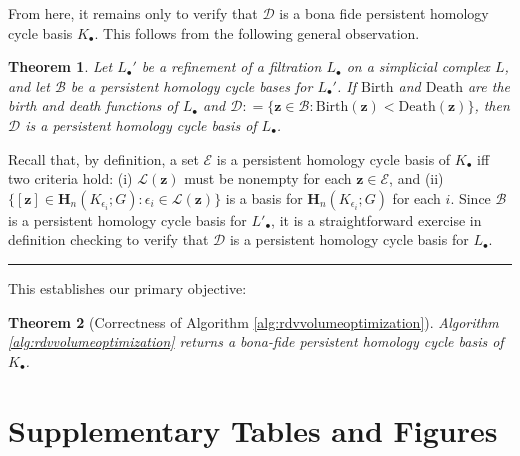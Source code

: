 \documentclass[11pt,onecolumn]{article}
\newtheorem{theorem}{Theorem}[section] %
\newenvironment{proof}{{\em Proof:}}{\hfill{\hfill\rule{2mm}{2mm}}}
\newcommand{\Homologies}[0]{\mathbf{H}}
\newcommand{\cycle}{{\mathbf z}}
\newcommand{\birth}{\mathrm{Birth}}
\newcommand{\death}{\mathrm{Death}}
\newcommand{\persinterval}{\mathcal{L}}
\newcommand{\hcyclebasis}{\mathcal B}
\newcommand{\cald}{\mathcal D}
\newcommand{\cale}{\mathcal E}
\theoremstyle{plain}
\theoremstyle{definition}
\begin{document}
From here, it remains only to verify that $\mathcal D$ is a bona fide persistent homology cycle basis $K_\bullet$.  This follows from the following general observation.



\begin{theorem}
Let $L_\bullet'$ be a refinement of a filtration $L_\bullet$ on a simplicial complex $L$, and let $\hcyclebasis$ be a persistent homology cycle bases for $L_\bullet'$.  If $\birth$ and $\death$ are the birth and death functions of $L_\bullet$ and ${\mathcal D}: = \{\cycle \in \hcyclebasis : \birth(\cycle) < \death(\cycle) \}$, then $\cald$ is a persistent homology cycle basis of $L_\bullet$.
\end{theorem}
\begin{proof}
Recall that, by definition, a set $\cale$ is a persistent homology cycle basis of $K_\bullet$ iff two criteria hold: (i) $\persinterval(\cycle)$ must be nonempty for each $\cycle \in \cale$, and (ii) $\{ [\cycle]\in \Homologies_n(K_{\epsilon_i}; G) : \epsilon_i \in \persinterval(\cycle) \}$ is a basis for $\Homologies_n(K_{\epsilon_i}; G)$ for each $i$.  Since $\hcyclebasis$ is a persistent homology cycle basis for $L'_\bullet$, it is a straightforward exercise in definition checking to verify that $\cald$ is a persistent homology cycle basis for $L_\bullet$.
\end{proof}


This establishes our primary objective:

\begin{theorem}[Correctness of Algorithm \ref{alg:rdvvolumeoptimization}]
Algorithm \ref{alg:rdvvolumeoptimization} returns a bona-fide persistent homology cycle basis of $K_\bullet$.
\end{theorem}


 

\section{Supplementary Tables and Figures}
\end{document}

